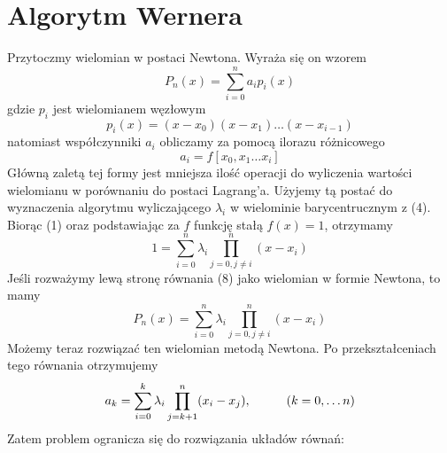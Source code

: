 \documentclass[11pt, wide]{article}
\begin{document}
\section{Algorytm Wernera}
Przytoczmy wielomian w postaci Newtona. Wyraża się on wzorem
\begin{equation}
    P_n(x) = \sum_{i=0}^{n}a_i p_i(x)
\end{equation}
gdzie $p_i$ jest wielomianem węzłowym
\begin{equation*}
    p_i(x) = (x - x_0)(x - x_1)\ldots(x - x_{i-1})
\end{equation*}
natomiast współczynniki $a_i$ obliczamy za pomocą ilorazu różnicowego
\begin{equation*}
    a_i = f[x_0,x_1\ldots x_i]
\end{equation*}
Główną zaletą tej formy jest mniejsza ilość operacji do wyliczenia wartości
wielomianu w porównaniu do postaci Lagrang'a. Użyjemy tą postać do wyznaczenia algorytmu
wyliczającego $\lambda_i$ w wielominie barycentrucznym z (4).
\\
Biorąc (1) oraz podstawiając za $f$ funkcję stałą $f(x) = 1$, otrzymamy
\begin{equation}
    1 = \sum_{i = 0}^n\lambda_i\prod_{j=0,j\neq i}^{n}(x - x_i)
\end{equation}
Jeśli rozważymy lewą stronę równania (8) jako wielomian w formie Newtona, to mamy
\begin{equation*}
    P_n(x) = \sum_{i = 0}^n\lambda_i\prod_{j=0,j\neq i}^{n}(x - x_i)
\end{equation*}
Możemy teraz rozwiązać ten wielomian metodą Newtona.
Po przekształceniach tego równania otrzymujemy
\begin{equation*}
    a_k = \sum_{i=0}^{k}\lambda_i\prod_{j=k+1}^{n}(x_i - x_j),\hspace*{1cm} (k = 0, \ldots n)
\end{equation*}
Zatem problem ogranicza się do rozwiązania układów równań:
\end{document}
